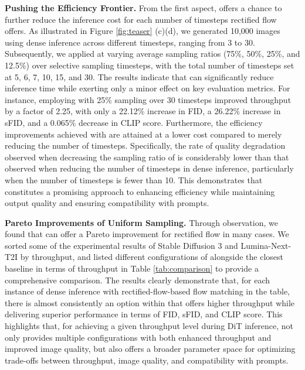\noindent \textbf{Pushing the Efficiency Frontier.} From the first aspect, \ourmethod{} offers a chance to further reduce the inference cost for each number of timesteps rectified flow offers. As illustrated in Figure \ref{fig:teaser} (c)(d), we generated 10,000 images using dense inference across different timesteps, ranging from 3 to 30. Subsequently, we applied \ourmethod{} at varying average sampling ratios (75\%, 50\%, 25\%, and 12.5\%) over selective sampling timesteps, with the total number of timesteps set at 5, 6, 7, 10, 15, and 30. The results indicate that \ourmethod{} can significantly reduce inference time while exerting only a minor effect on key evaluation metrics. For instance, employing \ourmethod{} with 25\% sampling over 30 timesteps improved throughput by a factor of 2.25, with only a 22.12\% increase in FID, a 26.22\% increase in sFID, and a 0.065\% decrease in CLIP score. Furthermore, the efficiency improvements achieved with \ourmethod{} are attained at a lower cost compared to merely reducing the number of timesteps. Specifically, the rate of quality degradation observed when decreasing the sampling ratio of \ourmethod{} is considerably lower than that observed when reducing the number of timesteps in dense inference, particularly when the number of timesteps is fewer than 10. This demonstrates that \ourmethod{} constitutes a promising approach to enhancing efficiency while maintaining output quality and ensuring compatibility with prompts.


\noindent \textbf{Pareto Improvements of Uniform Sampling.} Through observation, we found that \ourmethod{} can offer a Pareto improvement for rectified flow in many cases. We sorted some of the experimental results of Stable Diffusion 3 and Lumina-Next-T2I by throughput, and listed different configurations of \ourmethod{} alongside the closest baseline in terms of throughput in Table \ref{tab:comparison} to provide a comprehensive comparison. The results clearly demonstrate that, for each instance of dense inference with rectified-flow-based flow matching in the table, there is almost consistently an option within \ourmethod{} that offers higher throughput while delivering superior performance in terms of FID, sFID, and CLIP score. This highlights that, for achieving a given throughput level during DiT inference, \ourmethod{} not only provides multiple configurations with both enhanced throughput and improved image quality, but also offers a broader parameter space for optimizing trade-offs between throughput, image quality, and compatibility with prompts. 




